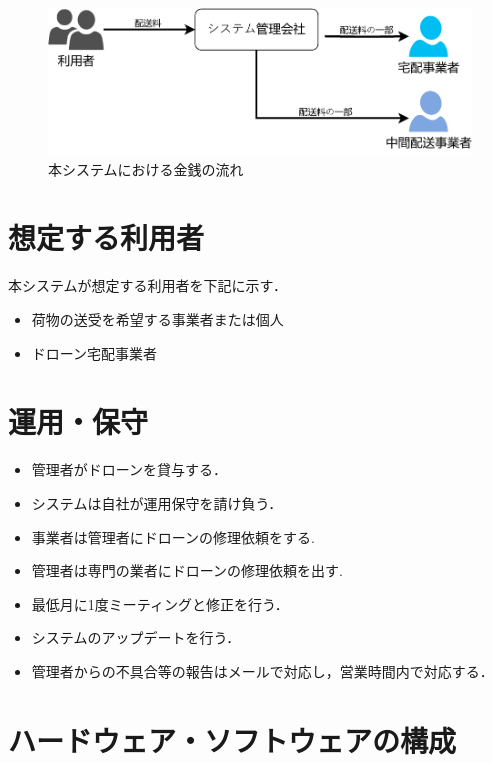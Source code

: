 \documentclass[a4paper, titlepage]{jsarticle}
\begin{document}
\begin{figure}[H]
  \centering
  \includegraphics[width=0.8\linewidth]{./money_flow.pdf}
  \caption{本システムにおける金銭の流れ}
  \label{fig:money_flow}
\end{figure}


\section{想定する利用者}
本システムが想定する利用者を下記に示す．
\begin{itemize}
  \item 荷物の送受を希望する事業者または個人
  \item ドローン宅配事業者
\end{itemize}

\section{運用・保守}
\begin{itemize}
  \item 管理者がドローンを貸与する．
  \item システムは自社が運用保守を請け負う．
  \item 事業者は管理者にドローンの修理依頼をする.
  \item 管理者は専門の業者にドローンの修理依頼を出す.
  \item 最低月に1度ミーティングと修正を行う．
  \item システムのアップデートを行う．
  \item 管理者からの不具合等の報告はメールで対応し，営業時間内で対応する．
\end{itemize}

\section{ハードウェア・ソフトウェアの構成}
\end{document}
